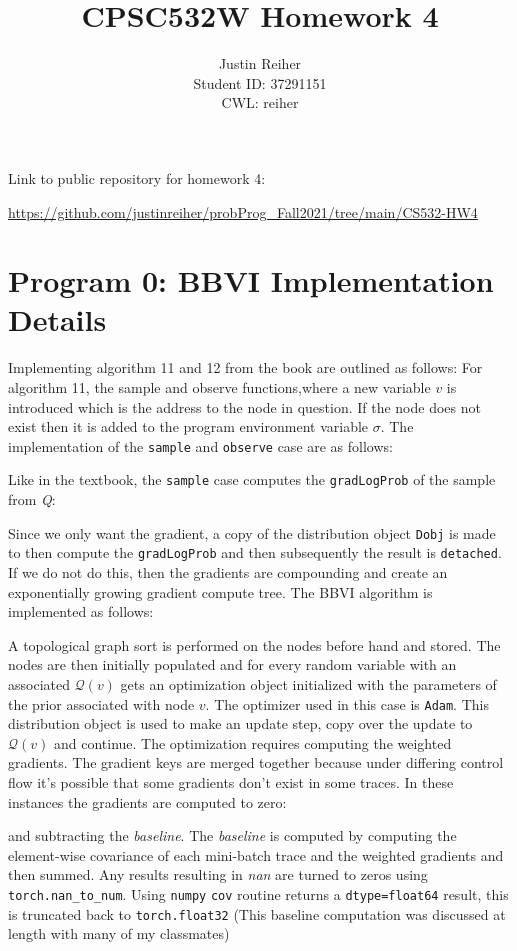 \documentclass[]{article}
\title{CPSC532W Homework 4}
\author{Justin Reiher\\ Student ID: 37291151\\ CWL: reiher}
\date{}
\begin{document}
\maketitle

Link to public repository for homework 4:
\begin{center}
	\url{https://github.com/justinreiher/probProg_Fall2021/tree/main/CS532-HW4}
\end{center}

\section{Program 0: BBVI Implementation Details}
 Implementing algorithm 11 and 12 from the book are outlined as follows:
 For algorithm 11, the sample and observe functions,where a new variable $v$ is introduced which is the address to the node in question. If the node does not exist then it is added to the program environment variable $\sigma$. The implementation of the \texttt{sample} and \texttt{observe} case are as follows:
 
 Like in the textbook, the \texttt{sample} case computes the \texttt{gradLogProb} of the sample from \emph{Q}:
 
 Since we only want the gradient, a copy of the distribution object \texttt{Dobj} is made to then compute the \texttt{gradLogProb} and then subsequently the result is \texttt{detached}. If we do not do this, then the gradients are compounding and create an exponentially growing gradient compute tree.
 The BBVI algorithm is implemented as follows:
 
 A topological graph sort is performed on the nodes before hand and stored. The nodes are then initially populated and for every random variable with an associated $\mathcal{Q}(v)$ gets an optimization object initialized with the parameters of the prior associated with node $v$. The optimizer used in this case is \texttt{Adam}. This distribution object is used to make an update step, copy over the update to $\mathcal{Q}(v)$ and continue. The optimization requires computing the weighted gradients. The gradient keys are merged together because under differing control flow it's possible that some gradients don't exist in some traces. In these instances the gradients are computed to zero:
  
 and subtracting the \emph{baseline}. The \emph{baseline} is computed by computing the element-wise covariance of each mini-batch trace and the weighted gradients and then summed. Any results resulting in \emph{nan} are turned to zeros using \texttt{torch.nan\_to\_num}. Using \texttt{numpy} \texttt{cov} routine returns a \texttt{dtype=float64} result, this is truncated back to \texttt{torch.float32} (This baseline computation was discussed at length with many of my classmates)
\end{document}
